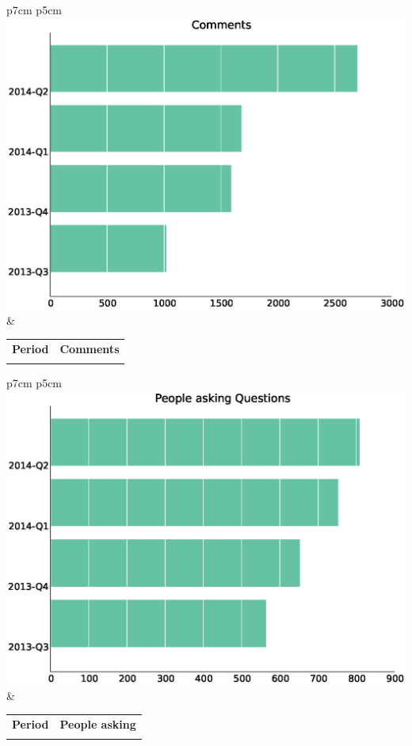 \documentclass[a4wide,11pt]{report}
\begin{document}
\begin{tabular}{p{7cm} p{5cm}}
    \vspace{0pt} 
    \includegraphics[scale=.35]{figs/comments.eps}
    & 
    \vspace{0pt}
    \begin{tabular}{l|l}%
    \bfseries Period & \bfseries Comments %
    \csvreader[head to column names]{data/comments.csv}{}%
    {\\ & \comments}
    \end{tabular}
\end{tabular}

\begin{tabular}{p{7cm} p{5cm}}
    \vspace{0pt} 
    \includegraphics[scale=.35]{figs/question_senders.eps}
    & 
    \vspace{0pt}
    \begin{tabular}{l|l}%
    \bfseries Period & \bfseries People asking %
    \csvreader[head to column names]{data/question_senders.csv}{}%
    {\\ & \senders}
    \end{tabular}
\end{tabular}
\end{document}
